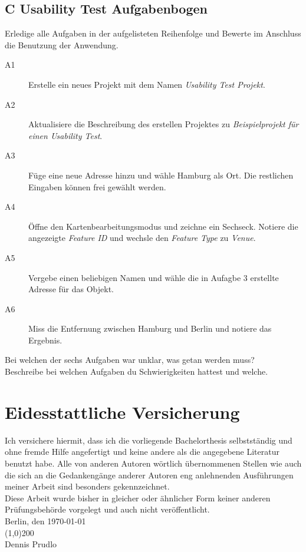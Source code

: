 \section*{C Usability Test Aufgabenbogen}
\label{sec:appendixc}
Erledige alle Aufgaben in der aufgelisteten Reihenfolge und Bewerte im Anschluss die Benutzung der Anwendung.
\begin{description}
	\item[A1] Erstelle ein neues Projekt mit dem Namen \emph{Usability Test Projekt}.
	\item[A2] Aktualisiere die Beschreibung des erstellen Projektes zu \emph{Beispielprojekt für einen Usability Test}.
	\item[A3] Füge eine neue Adresse hinzu und wähle Hamburg als Ort. Die restlichen Eingaben können frei gewählt werden.
	\item[A4] Öffne den Kartenbearbeitungsmodus und zeichne ein Sechseck. Notiere die angezeigte \emph{Feature ID} und wechsle den \emph{Feature Type} zu \emph{Venue}.
	\item[A5] Vergebe einen beliebigen Namen und wähle die in Aufagbe 3 erstellte Adresse für das Objekt.
	\item[A6] Miss die Entfernung zwischen Hamburg und Berlin und notiere das Ergebnis.
\end{description}
\begin{description}
	\item[Bei welchen der sechs Aufgaben war unklar, was getan werden muss?]
	\item[Beschreibe bei welchen Aufgaben du Schwierigkeiten hattest und welche.]
\end{description}

%
\chapter*{Eidesstattliche Versicherung}
Ich versichere hiermit, dass ich die vorliegende Bachelorthesis selbstständig und ohne fremde Hilfe
angefertigt und keine andere als die angegebene Literatur benutzt habe. Alle von anderen Autoren
wörtlich übernommenen Stellen wie auch die sich an die Gedankengänge anderer Autoren eng anlehnenden
Ausführungen meiner Arbeit sind besonders gekennzeichnet.\\[1ex]
Diese Arbeit wurde bisher in gleicher oder ähnlicher Form keiner anderen Prüfungsbehörde vorgelegt
und auch nicht veröffentlicht.\\[3ex]
Berlin, den \today\\[20ex]
\line(1,0){200}\\
Dennis Prudlo
\clearpage
